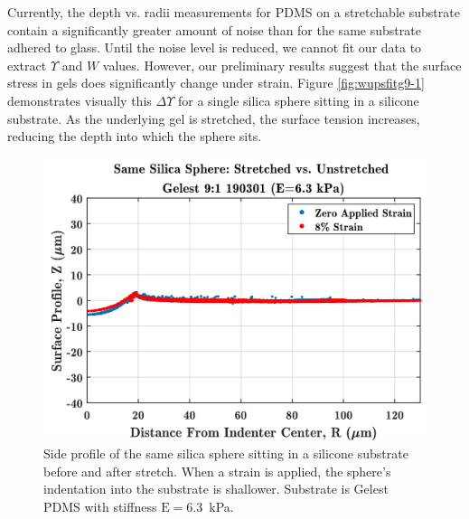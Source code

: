 Currently, the depth vs. radii measurements for PDMS on a stretchable substrate contain a significantly greater amount of noise than for the same substrate adhered to glass. Until the noise level is reduced, we cannot fit our data to extract $ \Upsilon $ and $ W $ values. However, our preliminary results suggest that the surface stress in gels does significantly change under strain. Figure \ref{fig:wupsfitg9-1} demonstrates visually this $ \Delta\Upsilon $ for a single silica sphere sitting in a silicone substrate. As the underlying gel is stretched, the surface tension increases, reducing the depth into which the sphere sits. 
\begin{figure}[h!]
	\centering
	\includegraphics[width=\linewidth]{Chapters/Figures/stretch_v_unstretched_0-88-ST1_INTRO}
	\caption[Side Collapse Comparison]{Side profile of the same silica sphere sitting in a silicone substrate before and after stretch. When a strain is applied, the sphere's indentation into the substrate is shallower. Substrate is Gelest PDMS with stiffness $\text{E}=6.3$~kPa.}	
	\label{fig:sc1unstretchedv8ml}
\end{figure}

